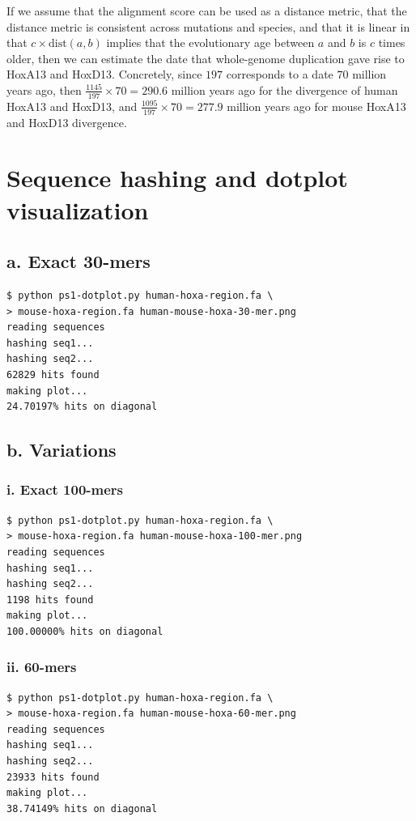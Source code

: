\documentclass[a4paper]{article}
\begin{document}
If we assume that the alignment score can be used as a distance metric,
that the distance metric is consistent across mutations and species,
and that it is linear in that $c \times \text{dist}(a, b)$ implies that
the evolutionary age between $a$ and $b$ is $c$ times older, then
we can estimate the date that whole-genome duplication gave rise to HoxA13
and HoxD13. Concretely, since $197$ corresponds to a date $70$ million
years ago, then $\frac{1145}{197} \times 70 = 290.6$ million years ago
for the divergence of human HoxA13 and HoxD13, and
$\frac{1095}{197} \times 70 = 277.9$ million years ago for
mouse HoxA13 and HoxD13 divergence.

\section{Sequence hashing and dotplot visualization}

\subsection*{a. Exact 30-mers}

\begin{verbatim}
$ python ps1-dotplot.py human-hoxa-region.fa \
> mouse-hoxa-region.fa human-mouse-hoxa-30-mer.png
reading sequences
hashing seq1...
hashing seq2...
62829 hits found
making plot...
24.70197% hits on diagonal
\end{verbatim}

\subsection*{b. Variations}
\subsubsection*{i. Exact 100-mers}
\begin{verbatim}
$ python ps1-dotplot.py human-hoxa-region.fa \
> mouse-hoxa-region.fa human-mouse-hoxa-100-mer.png
reading sequences
hashing seq1...
hashing seq2...
1198 hits found
making plot...
100.00000% hits on diagonal
\end{verbatim}

\subsubsection*{ii. 60-mers}
\begin{verbatim}
$ python ps1-dotplot.py human-hoxa-region.fa \
> mouse-hoxa-region.fa human-mouse-hoxa-60-mer.png
reading sequences
hashing seq1...
hashing seq2...
23933 hits found
making plot...
38.74149% hits on diagonal
\end{verbatim}
\end{document}
